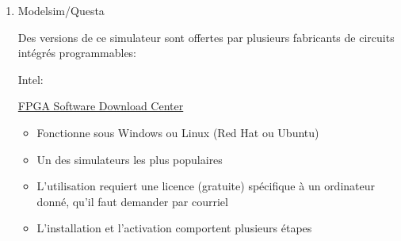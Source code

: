 \documentclass[letter, oneside]{book}
\begin{document}
\begin{enumerate}
\item Modelsim/Questa
\label{sec:orgfd069cc}

Des versions de ce simulateur sont offertes par plusieurs fabricants
de circuits intégrés programmables:

Intel: 

\href{https://www.intel.com/content/www/us/en/collections/products/fpga/software/downloads.html?s=Newest\&f=\%255B\%257B\%2522name\%2522\%3A\%2522quartusedition\%2522\%2C\%2522facetId\%2522\%3A\%2522quartusedition\%2522\%2C\%2522currentValues\%2522\%3A\%255B\%255D\%257D\%2C\%257B\%2522name\%2522\%3A\%2522quartusaddon\%2522\%2C\%2522facetId\%2522\%3A\%2522quartusaddon\%2522\%2C\%2522currentValues\%2522\%3A\%255B\%257B\%2522value\%2522\%3A\%2522Intel\%25C2\%25AE\%2520FPGA\%2520Simulation\%2520Tools\%2522\%2C\%2522state\%2522\%3A\%2522idle\%2522\%2C\%2522children\%2522\%3A\%255B\%257B\%2522value\%2522\%3A\%2522Questa*-Intel\%25C2\%25AE\%2520FPGA\%2520Starter\%2520Edition\%2522\%2C\%2522state\%2522\%3A\%2522selected\%2522\%257D\%255D\%257D\%255D\%257D\%2C\%257B\%2522name\%2522\%3A\%2522fpgadevicefamily\%2522\%2C\%2522facetId\%2522\%3A\%2522fpgadevicefamily\%2522\%2C\%2522currentValues\%2522\%3A\%255B\%255D\%257D\%2C\%257B\%2522name\%2522\%3A\%2522fpgaplatform\%2522\%2C\%2522facetId\%2522\%3A\%2522fpgaplatform\%2522\%2C\%2522currentValues\%2522\%3A\%255B\%255D\%257D\%2C\%257B\%2522facetId\%2522\%3A\%2522os-rdc\%2522\%2C\%2522name\%2522\%3A\%2522OperatingSystem\%2522\%2C\%2522currentValues\%2522\%3A\%255B\%255D\%257D\%2C\%257B\%2522facetId\%2522\%3A\%2522\%40emtcontenttype\_en\%2522\%2C\%2522name\%2522\%3A\%2522ContentType\%2522\%2C\%2522currentValues\%2522\%3A\%255B\%255D\%257D\%2C\%257B\%2522facetId\%2522\%3A\%2522lastupdated-rdc\%2522\%2C\%2522name\%2522\%3A\%2522lastupdated\%2522\%2C\%2522currentValues\%2522\%3A\%255B\%255D\%257D\%255D\&q=lite}{FPGA Software Download Center}


\begin{itemize}
\item Fonctionne sous Windows ou Linux (Red Hat ou Ubuntu)
\item Un des simulateurs les plus populaires
\item L'utilisation requiert une licence (gratuite) spécifique à un
ordinateur donné, qu'il faut demander par courriel
\item L'installation et l'activation comportent plusieurs étapes
\end{itemize}



\end{enumerate}
\end{document}
